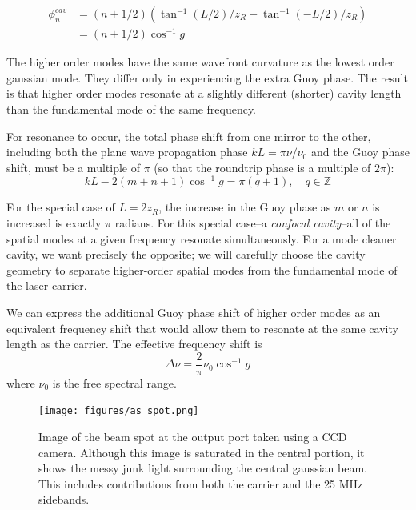 \begin{align}
\phi^{cav}_n & =  \left(n+1/2\right)\left(\tan^{-1} (L/2)/z_R - \tan^{-1} (-L/2)/z_R\right) \\
            & = \left(n+1/2\right)\cos^{-1} g
\end{align}

The higher order modes have the same wavefront curvature as the lowest
order gaussian mode.  They differ only in experiencing the extra Guoy
phase.  The result is that higher order modes resonate at a slightly
different (shorter) cavity length than the fundamental mode of the
same frequency.

For resonance to occur, the total phase shift from one mirror to the
other, including both the plane wave propagation phase
$kL=\pi\nu/\nu_0$ and the Guoy phase shift, must be a multiple of
$\pi$ (so that the roundtrip phase is a multiple of $2\pi$):
%
\begin{equation}
kL - 2\left(m+n+1\right)\cos^{-1} g = \pi(q+1),
\quad q\in\mathbb{Z}
\end{equation}

For the special case of $L = 2 z_R$, the increase in the Guoy phase as
$m$ or $n$ is increased is exactly $\pi$ radians.  For this special
case--a \emph{confocal cavity}--all of the spatial modes at a given
frequency resonate simultaneously.  For a mode cleaner cavity, we want
precisely the opposite; we will carefully choose the cavity geometry
to separate higher-order spatial modes from the fundamental mode of
the laser carrier.

We can express the additional Guoy phase shift of higher order modes
as an equivalent frequency shift that would allow them to resonate at
the same cavity length as the carrier.  The effective frequency shift is
%
\begin{equation}
\Delta\nu = \frac{2}{\pi} \nu_0 \cos^{-1} g
\label{eq:hom-frequency-shift}
\end{equation}
%
where $\nu_0$ is the free spectral range.

\begin{figure}[t]
\centerline{\texttt{[image: figures/as\_spot.png]}}
\caption[Beam spot at anti-symmetric port]{\label{fig:as-spot}Image of
  the beam spot at the output port taken using a CCD camera. Although
  this image is saturated in the central portion, it shows the messy
  junk light surrounding the central gaussian beam.  This includes
  contributions from both the carrier and the 25 MHz sidebands.}
\end{figure}

